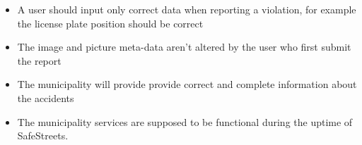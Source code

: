 \begin{itemize}

\item A user should input only correct data when reporting a violation, for example the license plate position should be correct

\item The image and picture meta-data aren't altered by the user who first submit the report

\item The municipality will provide provide correct and complete information 
about the accidents

\item The municipality services are supposed to be functional during the uptime of SafeStreets.

\end{itemize}